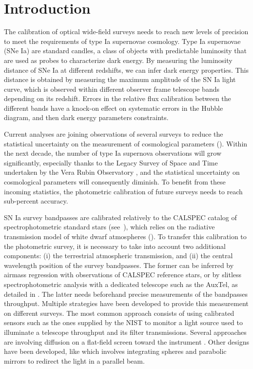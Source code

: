 \section{Introduction}

The calibration of optical wide-field surveys needs to reach new levels of precision to meet the requirements of type Ia supernovae cosmology. Type Ia supernovae (SNe Ia) are standard candles, a class of objects with predictable luminosity that are used as probes to characterize dark energy. By measuring the luminosity distance of SNe Ia at different redshifts, we can infer dark energy properties. This distance is obtained by measuring the maximum amplitude of the SN Ia light curve, which is observed within different observer frame telescope bands depending on its redshift. Errors in the relative flux calibration between the different bands have a knock-on effect on systematic errors in the Hubble diagram, and then dark energy parameters constraints.

Current analyses are joining observations of several surveys to reduce the statistical uncertainty on the measurement of cosmological parameters (\citealt{Betoule_2014,Scolnic_2018,Brout_2022,rubin2023union}). Within the next decade, the number of type Ia supernova observations will grow significantly, especially thanks to the Legacy Survey of Space and Time undertaken by the Vera Rubin Observatory  \citep{lsst}, and the statistical uncertainty on cosmological parameters will consequently diminish. To benefit from these incoming statistics, the photometric calibration of future surveys needs to reach sub-percent accuracy.

SN Ia survey bandpasses are calibrated relatively to the CALSPEC catalog of spectrophotometric standard stars (see~\cite{Bohlin_2020}), which relies on the radiative transmission model of white dwarf atmospheres (\cite{Narayan_2019}). To transfer this calibration to the photometric survey, it is necessary to take into account two additional components: (i) the terrestrial atmospheric transmission, and (ii) the central wavelength position of the survey bandpasses. The former can be inferred by airmass regression with observations of CALSPEC reference stars, or by slitless spectrophotometric analysis with a dedicated telescope such as the AuxTel, as detailed in \cite{2021ascl.soft04004N}. The latter needs beforehand precise measurements of the bandpasses throughput. Multiple strategies have been developed to provide this measurement on different surveys. The most common approach consists of using calibrated sensors such as the ones supplied by the NIST \citep{houston2008detectors} to monitor a light source used to illuminate a telescope throughput and its filter transmissions. Several approaches are involving diffusion on a flat-field screen toward the instrument \citep{stubbs2006,marshall2013}. Other designs have been developed, like \cite{Lombardo_2017} which involves integrating spheres and parabolic mirrors to redirect the light in a parallel beam.

